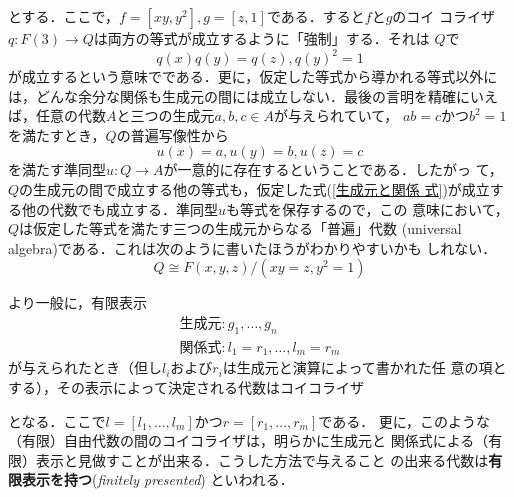\begin{example}[代数の表示]
\begin{center}
 \end{center}
 とする．ここで，$f = [xy, y^2], g = [z, 1]$である．すると$f$と$g$のコイ
 コライザ$q: F(3) \to Q$は両方の等式が成立するように「強制」する．それは
 $Q$で
 \[
  q(x)q(y) = q(z), q(y)^2 = 1
 \]
 が成立するという意味でである．更に，仮定した等式から導かれる等式以外に
 は，どんな余分な関係も生成元の間には成立しない．最後の言明を精確にいえ
 ば，任意の代数$A$と三つの生成元$a, b, c \in A$が与えられていて，
 $ab = c$かつ$b^2 = 1$を満たすとき，$Q$の普遍写像性から
 \[
  u(x) = a, u(y) = b, u(z) = c
 \]
 を満たす準同型$u: Q \to A$が一意的に存在するということである．したがっ
 て，$Q$の生成元の間で成立する他の等式も，仮定した式(\ref{生成元と関係
 式})が成立する他の代数でも成立する．準同型$u$も等式を保存するので，この
 意味において，$Q$は仮定した等式を満たす三つの生成元からなる「普遍」代数
 (universal algebra)である．これは次のように書いたほうがわかりやすいかも
 しれない．
 \[
  Q \cong F(x, y, z)/(xy = z, y^2 = 1)
 \]

 より一般に，有限表示
 \begin{equation}
  \begin{array}{l}
   \text{生成元}: g_1, \ldots, g_n\\
   \text{関係式}: l_1 = r_1, \ldots, l_m = r_m \label{生成元と関係式2}
  \end{array}
 \end{equation}
 が与えられたとき（但し$l_i$および$r_i$は生成元と演算によって書かれた任
 意の項とする），その表示によって決定される代数はコイコライザ
  \begin{center}
 \end{center}
 となる．ここで$l = [l_1, \ldots, l_m]$かつ$r= [r_1, \ldots, r_m]$である．
 更に，このような（有限）自由代数の間のコイコライザは，明らかに生成元と
 関係式による（有限）表示と見做すことが出来る．こうした方法で与えること
 の出来る代数は{\bfseries 有限表示を持つ}({\itshape finitely presented})
 といわれる．
\end{example}

